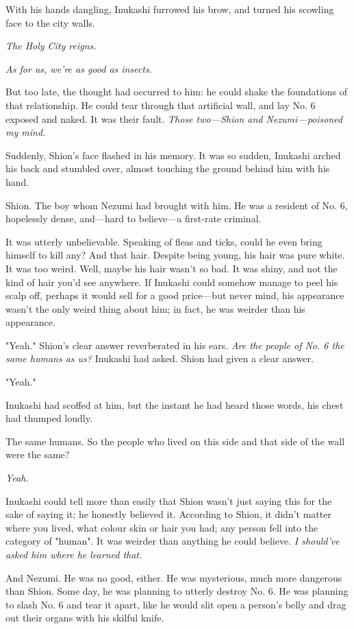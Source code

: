 With his hands dangling, Inukashi furrowed his brow, and turned his
scowling face to the city walls.

\emph{The Holy City reigns.}

\emph{As for us, we're as good as insects.}

But too late, the thought had occurred to him: he could shake the
foundations of that relationship. He could tear through that artificial
wall, and lay No. 6 exposed and naked. It was their fault. \emph{Those
two---Shion and Nezumi---poisoned my mind.}

Suddenly, Shion's face flashed in his memory. It was so sudden, Inukashi
arched his back and stumbled over, almost touching the ground behind him
with his hand.

Shion. The boy whom Nezumi had brought with him. He was a resident of
No. 6, hopelessly dense, and---hard to believe---a first-rate criminal.

It was utterly unbelievable. Speaking of fleas and ticks, could he even
bring himself to kill any? And that hair. Despite being young, his hair
was pure white. It was too weird. Well, maybe his hair wasn't so bad. It
was shiny, and not the kind of hair you'd see anywhere. If Inukashi
could somehow manage to peel his scalp off, perhaps it would sell for a
good price---but never mind, his appearance wasn't the only weird thing
about him; in fact, he was weirder than his appearance.

"Yeah." Shion's clear answer reverberated in his ears. \emph{Are the people of
No. 6 the same humans as us?} Inukashi had asked. Shion had given a clear
answer.

"Yeah."

Inukashi had scoffed at him, but the instant he had heard those words,
his chest had thumped loudly.

The same humans. So the people who lived on this side and that side of
the wall were the same?

\emph{Yeah.}

Inukashi could tell more than easily that Shion wasn't just saying this
for the sake of saying it; he honestly believed it. According to Shion,
it didn't matter where you lived, what colour skin or hair you had; any
person fell into the category of "human". It was weirder than anything
he could believe. \emph{I should've asked him where he learned that.}

And Nezumi. He was no good, either. He was mysterious, much more
dangerous than Shion. Some day, he was planning to utterly destroy No.
6. He was planning to slash No. 6 and tear it apart, like he would slit
open a person's belly and drag out their organs with his skilful knife.

